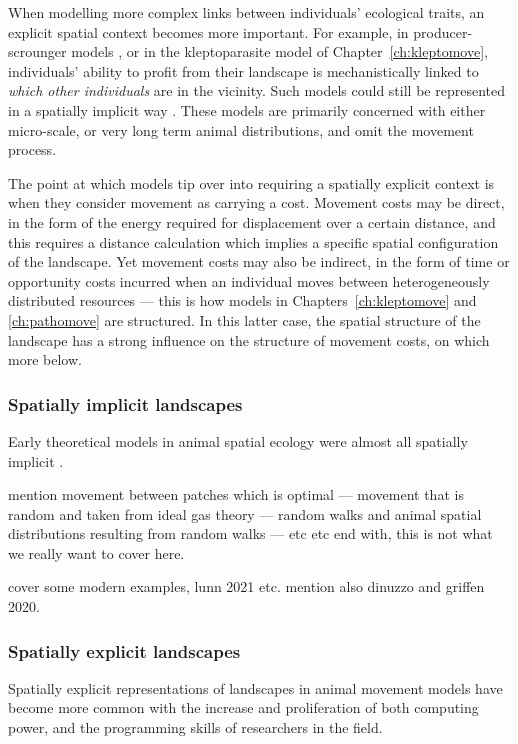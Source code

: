 When modelling more complex links between individuals' ecological traits, an explicit spatial context becomes more important.
For example, in producer-scrounger models \citep[e.g.][]{beauchamp2008}, or in the kleptoparasite model of Chapter~\ref{ch:kleptomove}, individuals' ability to profit from their landscape is mechanistically linked to \emph{which other individuals} are in the vicinity.
Such models could still be represented in a spatially implicit way \citep{cressman2006,krivan2008,garay2015,garay2020}.
These models are primarily concerned with either micro-scale, or very long term animal distributions, and omit the movement process.

The point at which models tip over into requiring a spatially explicit context is when they consider movement as carrying a cost.
Movement costs may be direct, in the form of the energy required for displacement over a certain distance, and this requires a distance calculation which implies a specific spatial configuration of the landscape.
Yet movement costs may also be indirect, in the form of time or opportunity costs incurred when an individual moves between heterogeneously distributed resources --- this is how models in Chapters~\ref{ch:kleptomove} and \ref{ch:pathomove} are structured.
In this latter case, the spatial structure of the landscape has a strong influence on the structure of movement costs, on which more below.

\subsubsection*{Spatially implicit landscapes}

Early theoretical models in animal spatial ecology were almost all spatially implicit \citep{fretwell1970,charnov1976}.

mention movement between patches which is optimal --- movement that is random and taken from ideal gas theory --- random walks and animal spatial distributions resulting from random walks --- etc etc
end with, this is not what we really want to cover here.

cover some modern examples, lunn 2021 etc. mention also dinuzzo and griffen 2020.

\subsubsection*{Spatially explicit landscapes}

Spatially explicit representations of landscapes in animal movement models have become more common with the increase and proliferation of both computing power, and the programming skills of researchers in the field.

